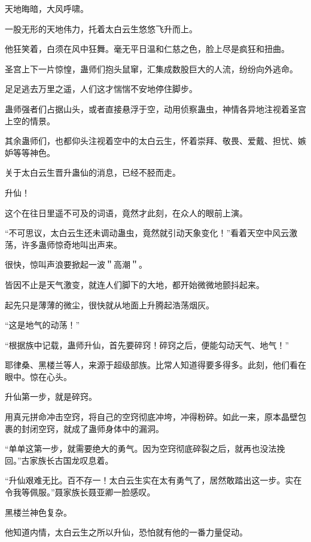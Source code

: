 
\begin{this_body}



天地晦暗，大风呼啸。

一股无形的天地伟力，托着太白云生悠悠飞升而上。

他狂笑着，白须在风中狂舞。毫无平日温和仁慈之色，脸上尽是疯狂和扭曲。

圣宫上下一片惊惶，蛊师们抱头鼠窜，汇集成数股巨大的人流，纷纷向外逃命。

足足逃去万里之遥，人们这才惴惴不安地停住脚步。

蛊师强者们占据山头，或者直接悬浮于空，动用侦察蛊虫，神情各异地注视着圣宫上空的情景。

其余蛊师们，也都仰头注视着空中的太白云生，怀着崇拜、敬畏、爱戴、担忧、嫉妒等等神色。

关于太白云生晋升蛊仙的消息，已经不胫而走。

升仙！

这个在往日里遥不可及的词语，竟然才此刻，在众人的眼前上演。

“不可思议，太白云生还未调动蛊虫，竟然就引动天象变化！”看着天空中风云激荡，许多蛊师惊奇地叫出声来。

很快，惊叫声浪要掀起一波＂高潮＂。

皆因不止是天气激变，就连人们脚下的大地，都开始微微地颤抖起来。

起先只是薄薄的微尘，很快就从地面上升腾起浩荡烟灰。

“这是地气的动荡！”

“根据族中记载，蛊师升仙，首先要碎窍！碎窍之后，便能勾动天气、地气！”

耶律桑、黑楼兰等人，来源于超级部族。比常人知道得要多得多。此刻，他们看在眼中。惊在心头。

升仙第一步，就是碎窍。

用真元拼命冲击空窍，将自己的空窍彻底冲垮，冲得粉碎。如此一来，原本晶壁包裹的封闭空窍，就成了蛊师身体中的漏洞。

“单单这第一步，就需要绝大的勇气。因为空窍彻底碎裂之后，就再也没法挽回。”古家族长古国龙叹息着。

“升仙艰难无比。百不存一！太白云生实在太有勇气了，居然敢踏出这一步。实在令我等佩服。”聂家族长聂亚卿一脸感叹。

黑楼兰神色复杂。

他知道内情，太白云生之所以升仙，恐怕就有他的一番力量促动。


\end{this_body}

